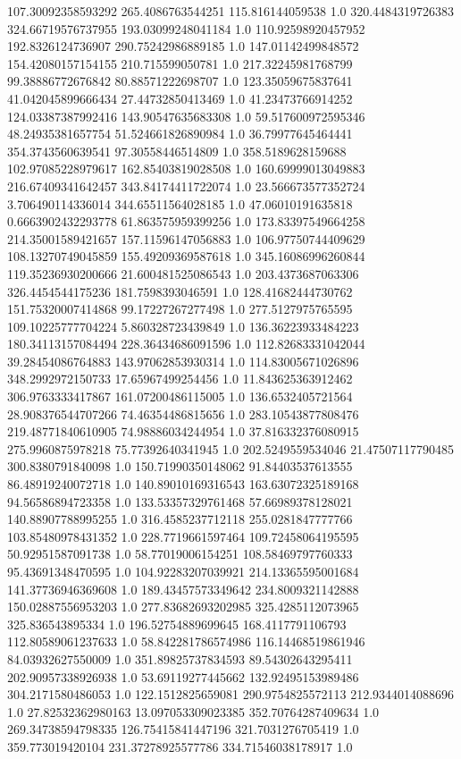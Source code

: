 107.30092358593292	265.4086763544251	115.816144059538	1.0
320.4484319726383	324.66719576737955	193.03099248041184	1.0
110.92598920457952	192.8326124736907	290.75242986889185	1.0
147.01142499848572	154.42080157154155	210.715599050781	1.0
217.32245981768799	99.38886772676842	80.88571222698707	1.0
123.35059675837641	41.042045899666434	27.44732850413469	1.0
41.23473766914252	124.03387387992416	143.90547635683308	1.0
59.517600972595346	48.24935381657754	51.524661826890984	1.0
36.79977645464441	354.3743560639541	97.30558446514809	1.0
358.5189628159688	102.97085228979617	162.85403819028508	1.0
160.69999013049883	216.67409341642457	343.84174411722074	1.0
23.566673577352724	3.706490114336014	344.65511564028185	1.0
47.06010191635818	0.6663902432293778	61.863575959399256	1.0
173.83397549664258	214.35001589421657	157.11596147056883	1.0
106.97750744409629	108.13270749045859	155.49209369587618	1.0
345.16086996260844	119.35236930200666	21.600481525086543	1.0
203.4373687063306	326.4454544175236	181.7598393046591	1.0
128.41682444730762	151.75320007414868	99.17227267277498	1.0
277.5127975765595	109.10225777704224	5.860328723439849	1.0
136.36223933484223	180.34113157084494	228.36434686091596	1.0
112.82683331042044	39.28454086764883	143.97062853930314	1.0
114.83005671026896	348.2992972150733	17.65967499254456	1.0
11.843625363912462	306.9763333417867	161.07200486115005	1.0
136.6532405721564	28.908376544707266	74.46354486815656	1.0
283.10543877808476	219.48771840610905	74.98886034244954	1.0
37.816332376080915	275.9960875978218	75.77392640341945	1.0
202.5249559534046	21.47507117790485	300.8380791840098	1.0
150.71990350148062	91.84403537613555	86.48919240072718	1.0
140.89010169316543	163.63072325189168	94.56586894723358	1.0
133.53357329761468	57.66989378128021	140.88907788995255	1.0
316.4585237712118	255.0281847777766	103.85480978431352	1.0
228.7719661597464	109.72458064195595	50.92951587091738	1.0
58.77019006154251	108.58469797760333	95.43691348470595	1.0
104.92283207039921	214.13365595001684	141.37736946369608	1.0
189.43457573349642	234.8009321142888	150.02887556953203	1.0
277.83682693202985	325.4285112073965	325.836543895334	1.0
196.52754889699645	168.4117791106793	112.80589061237633	1.0
58.842281786574986	116.14468519861946	84.03932627550009	1.0
351.89825737834593	89.54302643295411	202.90957338926938	1.0
53.69119277445662	132.92495153989486	304.2171580486053	1.0
122.1512825659081	290.9754825572113	212.9344014088696	1.0
27.82532362980163	13.097053309023385	352.70764287409634	1.0
269.34738594798335	126.75415841447196	321.7031276705419	1.0
359.773019420104	231.37278925577786	334.71546038178917	1.0
